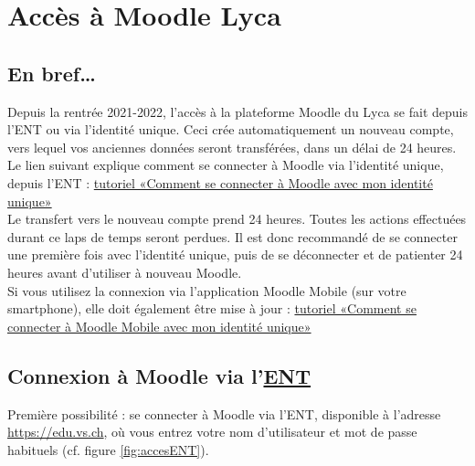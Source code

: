 \documentclass[10pt,a4paper]{report}
\begin{document}
\chapterFormat




\chapter*{Accès à Moodle Lyca}

\section*{En bref\dots}

Depuis la rentrée 2021-2022, l'accès à la plateforme Moodle du Lyca se fait depuis l'ENT ou via l'identité unique. Ceci crée automatiquement un nouveau compte, vers lequel vos anciennes données seront transférées, dans un délai de 24 heures.\\


Le lien suivant explique comment se connecter à Moodle via l'identité unique, depuis l'ENT : \href{https://support.ictvs.ch/media/attachments/2021/07/20/tutoriel\_moodle\_win-fr\_2-acces-identite-unique.pdf}{tutoriel «Comment se connecter à Moodle avec mon identité unique»}\\


\attention Le transfert vers le nouveau compte prend 24 heures. Toutes les actions effectuées durant ce laps de temps seront perdues. Il est donc recommandé de se connecter une première fois avec l'identité unique, puis de se déconnecter et de patienter 24 heures avant d’utiliser à nouveau Moodle.\\

Si vous utilisez la connexion via l’application Moodle Mobile (sur votre smartphone), elle doit également être mise à jour : \href{https://support.ictvs.ch/media/attachments/2021/07/22/tutoriel\_moodle\_android-fr\_2-acces-identite-unique-mobile.pdf}{tutoriel «Comment se connecter à Moodle Mobile avec mon identité unique»}


\section{Connexion à Moodle via l'\href{https://edu.vs.ch}{ENT}}


Première possibilité : se connecter à Moodle via l'ENT, disponible à l'adresse \href{https://edu.vs.ch}{https://edu.vs.ch}, où vous entrez votre nom d'utilisateur et mot de passe habituels (cf. figure \ref{fig:accesENT}).
\end{document}
